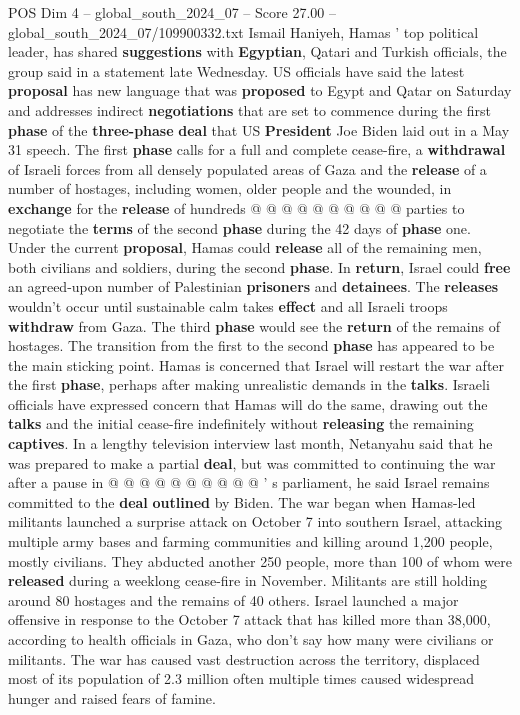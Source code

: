 \begin{textsample}{POS Dim 4 – global\_south\_2024\_07 – Score 27.00 – global\_south\_2024\_07/109900332.txt}
Ismail Haniyeh, Hamas ' top political leader, has shared \textbf{suggestions} with \textbf{Egyptian}, Qatari and Turkish officials, the group said in a statement late Wednesday.
US officials have said the latest \textbf{proposal} has new language that was \textbf{proposed} to Egypt and Qatar on Saturday and addresses indirect \textbf{negotiations} that are set to commence during the first \textbf{phase} of the \textbf{three-phase} \textbf{deal} that US \textbf{President} Joe Biden laid out in a May 31 speech.
The first \textbf{phase} calls for a full and complete cease-fire, a \textbf{withdrawal} of Israeli forces from all densely populated areas of Gaza and the \textbf{release} of a number of hostages, including women, older people and the wounded, in \textbf{exchange} for the \textbf{release} of hundreds @ @ @ @ @ @ @ @ @ @ parties to negotiate the \textbf{terms} of the second \textbf{phase} during the 42 days of \textbf{phase} one.
Under the current \textbf{proposal}, Hamas could \textbf{release} all of the remaining men, both civilians and soldiers, during the second \textbf{phase}.
In \textbf{return}, Israel could \textbf{free} an agreed-upon number of Palestinian \textbf{prisoners} and \textbf{detainees}.
The \textbf{releases} wouldn't occur until sustainable calm takes \textbf{effect} and all Israeli troops \textbf{withdraw} from Gaza.
The third \textbf{phase} would see the \textbf{return} of the remains of hostages.
The transition from the first to the second \textbf{phase} has appeared to be the main sticking point.
Hamas is concerned that Israel will restart the war after the first \textbf{phase}, perhaps after making unrealistic demands in the \textbf{talks}.
Israeli officials have expressed concern that Hamas will do the same, drawing out the \textbf{talks} and the initial cease-fire indefinitely without \textbf{releasing} the remaining \textbf{captives}.
In a lengthy television interview last month, Netanyahu said that he was prepared to make a partial \textbf{deal}, but was committed to continuing the war after a pause in @ @ @ @ @ @ @ @ @ @ ' s parliament, he said Israel remains committed to the \textbf{deal} \textbf{outlined} by Biden.
The war began when Hamas-led militants launched a surprise attack on October 7 into southern Israel, attacking multiple army bases and farming communities and killing around 1,200 people, mostly civilians.
They abducted another 250 people, more than 100 of whom were \textbf{released} during a weeklong cease-fire in November.
Militants are still holding around 80 hostages and the remains of 40 others.
Israel launched a major offensive in response to the October 7 attack that has killed more than 38,000, according to health officials in Gaza, who don't say how many were civilians or militants.
The war has caused vast destruction across the territory, displaced most of its population of 2.3 million often multiple times caused widespread hunger and raised fears of famine.

\end{textsample}
